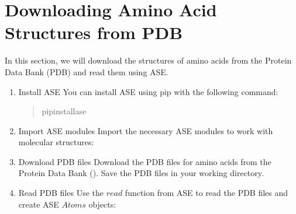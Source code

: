 \documentclass[letterpaper,10pt,english]{sphinxmanual}
\begin{document}
\section{Downloading Amino Acid Structures from PDB}
\label{\detokenize{nwase/nwase:downloading-amino-acid-structures-from-pdb}}
\sphinxAtStartPar
In this section, we will download the structures of amino acids from the Protein Data Bank (PDB) and read them using ASE.
\begin{enumerate}
%
\item {} 
\sphinxAtStartPar
Install ASE
\sphinxhyphen{} You can install ASE using pip with the following command:
\begin{quote}

\begin{sphinxVerbatim}[commandchars=\\\{\}]
pipinstallase
\end{sphinxVerbatim}
\end{quote}

\item {} 
\sphinxAtStartPar
Import ASE modules
\sphinxhyphen{} Import the necessary ASE modules to work with molecular structures:
\begin{quote}

\begin{sphinxVerbatim}[commandchars=\\\{\}]
   
\end{sphinxVerbatim}
\end{quote}

\item {} 
\sphinxAtStartPar
Download PDB files
\sphinxhyphen{} Download the PDB files for amino acids from the Protein Data Bank ().
\sphinxhyphen{} Save the PDB files in your working directory.

\item {} 
\sphinxAtStartPar
Read PDB files
\sphinxhyphen{} Use the \(read\) function from ASE to read the PDB files and create ASE \(Atoms\) objects:
\begin{quote}

\begin{sphinxVerbatim}[commandchars=\\\{\}]
  
  
\end{sphinxVerbatim}
\end{quote}

\end{enumerate}
\end{document}
